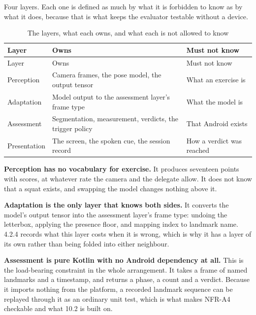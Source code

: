 Four layers. Each one is defined as much by what it is forbidden to know as by what it does, because that is what keeps the evaluator testable without a device.

{\small
\setlength{\LTpre}{6pt}\setlength{\LTpost}{8pt}
\begin{longtable}{>{\raggedright\arraybackslash}p{}>{\raggedright\arraybackslash}p{}>{\raggedright\arraybackslash}p{}}
\caption{The layers, what each owns, and what each is not allowed to know}\\
\toprule
Layer & Owns & Must not know \\
\midrule
\endfirsthead
\toprule
Layer & Owns & Must not know \\
\midrule
\endhead
\bottomrule
\endfoot
\bottomrule
\endlastfoot
Perception & Camera frames, the pose model, the output tensor & What an exercise is \\
Adaptation & Model output to the assessment layer's frame type & What the model is \\
Assessment & Segmentation, measurement, verdicts, the trigger policy & That Android exists \\
Presentation & The screen, the spoken cue, the session record & How a verdict was reached \\
\end{longtable}
}

\textbf{Perception has no vocabulary for exercise.} It produces seventeen points with scores, at whatever rate the camera and the delegate allow. It does not know that a squat exists, and swapping the model changes nothing above it.

\textbf{Adaptation is the only layer that knows both sides.} It converts the model's output tensor into the assessment layer's frame type: undoing the letterbox, applying the presence floor, and mapping index to landmark name. 4.2.4 records what this layer costs when it is wrong, which is why it has a layer of its own rather than being folded into either neighbour.

\textbf{Assessment is pure Kotlin with no Android dependency at all.} This is the load-bearing constraint in the whole arrangement. It takes a frame of named landmarks and a timestamp, and returns a phase, a count and a verdict. Because it imports nothing from the platform, a recorded landmark sequence can be replayed through it as an ordinary unit test, which is what makes NFR-A4 checkable and what 10.2 is built on.

